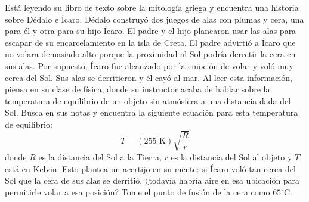 \item Está leyendo su libro de texto sobre la mitología griega y encuentra una historia sobre Dédalo e Ícaro. Dédalo construyó dos juegos de alas con plumas y cera, una para él y otra para su hijo Ícaro. El padre y el hijo planearon usar las alas para escapar de su encarcelamiento en la isla de Creta. El padre advirtió a Ícaro que no volara demasiado alto porque la proximidad al Sol podría derretir la cera en sus alas. Por supuesto, Ícaro fue alcanzado por la emoción de volar y voló muy cerca del Sol. Sus alas se derritieron y él cayó al mar. Al leer esta información, piensa en su clase de física, donde su instructor acaba de hablar sobre la temperatura de equilibrio de un objeto sin atmósfera a una distancia dada del Sol. Busca en sus notas y encuentra la siguiente ecuación para esta temperatura de equilibrio:
$$ T = (255\text{ K}) \sqrt{\frac{R}{r}} $$
donde $R$ es la distancia del Sol a la Tierra, $r$ es la distancia del Sol al objeto y $T$ está en Kelvin. Esto plantea un acertijo en su mente: si Ícaro voló tan cerca del Sol que la cera de sus alas se derritió, ¿todavía habría aire en esa ubicación para permitirle volar a esa posición? Tome el punto de fusión de la cera como $65^\circ\text{C}$.
